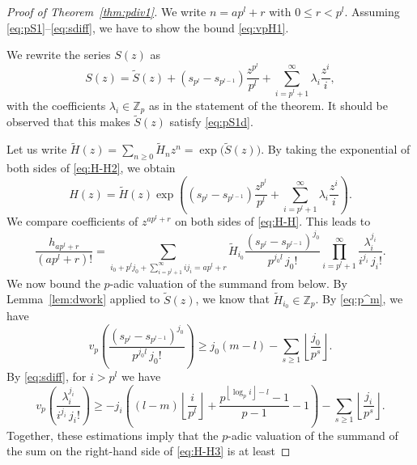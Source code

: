\documentclass[12pt,reqno]{amsart}
\numberwithin{equation}{section}
\theoremstyle{remark}
\begin{document}
\begin{proof}[Proof of Theorem~{\em \ref{thm:pdiv1}}]
We write $n=ap^l+r$ with $0\le r<p^l$.
Assuming \eqref{eq:pS1}--\eqref{eq:sdiff},
we have to show the bound \eqref{eq:vpH1}.

We rewrite the series $S(z)$ as
\begin{equation} \label{eq:H-H2} 
S(z)=\widetilde S(z)+(s_{p^l}-s_{p^{l-1}})\frac {z^{p^l}}
{p^l} + \sum_{i=p^l+1}^{\infty}{\lambda}_i\frac {z^{i}} {i},
\end{equation}
with the coefficients ${\lambda}_i\in {\mathbb{Z}}_p$ as in the statement
of the theorem. It should be observed that this makes 
$\widetilde S(z)$ satisfy \eqref{eq:pS1d}. 

Let us write $\widetilde
H(z)=\sum_{n\ge0}\widetilde H_nz^n=\exp\big(\widetilde S(z)\big)$.
By taking the exponential of both sides of \eqref{eq:H-H2}, we obtain 
\begin{equation} \label{eq:H-H}
H(z) =
\widetilde H(z)\exp\left((s_{p^l}-s_{p^{l-1}})\frac {z^{p^l}}
{p^l} + \sum_{i=p^l+1}^{\infty}{\lambda}_i\frac {z^{i}} {i}
\right) .
\end{equation}
We compare coefficients of $z^{ap^l+r}$ on both sides of
\eqref{eq:H-H}. This leads to
\begin{equation} \label{eq:H-H3} 
\frac {h_{ap^l+r}} {(ap^l+r)!}=
\sum_{i_0+p^lj_0+\sum_{i=p^l+1}^\infty ij_i=ap^l+r}
\widetilde H_{i_0}
\frac {(s_{p^l}-s_{p^{l-1}})^{j_0}} {p^{j_0l}\,j_0!}
\prod _{i=p^l+1} ^{\infty}
\frac {{\lambda}_i^{j_i}}
{i^{j_i}\,j_i!}.
\end{equation}
We now bound the $p$-adic valuation of the summand from below.
By Lemma~\ref{lem:dwork} applied to $\widetilde S(z)$, 
we know that $\widetilde H_{i_0}\in {\mathbb{Z}}_p$.
By \eqref{eq:p^m}, we have
\begin{equation*} 
v_p\left(\frac {(s_{p^l}-s_{p^{l-1}})^{j_0}} {p^{j_0l}\,j_0!}
\right) 
\ge
j_0(m-l)-\sum_{s\ge1}{\left\lfloor{\frac {j_0} {p^s}}\right\rfloor}.
\end{equation*}
By \eqref{eq:sdiff}, for $i>p^l$ we have
\begin{equation*} 
v_p\left(\frac {{\lambda}_{i}^{j_{i}}}
{i^{j_{i}}\,j_{i}!}\right) 
\ge 
-j_{i}\left((l-m){\left\lfloor{\frac {i} {p^{l}}}\right\rfloor}
+\frac {p^{{\left\lfloor{\log_pi}\right\rfloor}-l}-1} {p-1}-1
\right)
-\sum_{s\ge1}{\left\lfloor{\frac {j_{i}} {p^s}}\right\rfloor}.
\end{equation*}
Together, these estimations imply that the $p$-adic valuation of the
summand of the sum on the right-hand side of \eqref{eq:H-H3} is at least

\end{proof}
\end{document}
